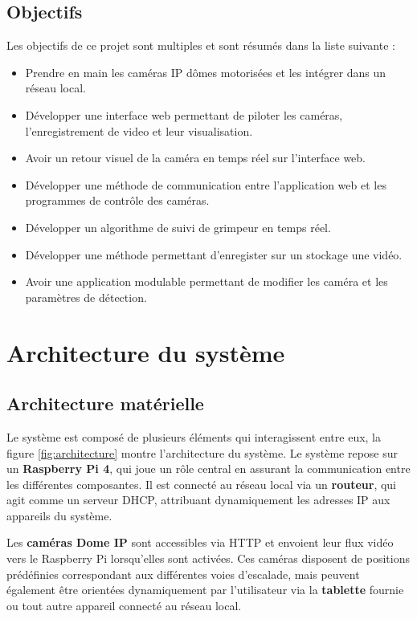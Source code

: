 \documentclass[a4paper, 11pt, french]{article}
\newcounter{obj}
\begin{document}
\subsection{Objectifs}
Les objectifs de ce projet sont multiples et sont résumés dans la liste suivante :
\begin{itemize}
  \item Prendre en main les caméras IP dômes motorisées et les intégrer dans un réseau local.
  \item Développer une interface web permettant de piloter les caméras, l'enregistrement de video et leur visualisation.
  \item Avoir un retour visuel de la caméra en temps réel sur l'interface web.
  \item Développer une méthode de communication entre l'application web et les programmes de contrôle des caméras.
  \item Développer un algorithme de suivi de grimpeur en temps réel.
  \item Développer une méthode permettant d'enregister sur un stockage une vidéo.
  \item Avoir une application modulable permettant de modifier les caméra et les paramètres de détection.
\end{itemize}

\section{Architecture du système}
\subsection{Architecture matérielle}
Le système est composé de plusieurs éléments qui interagissent entre eux, la figure \ref{fig:architecture} montre l'architecture du système. Le système repose sur un \textbf{Raspberry Pi 4}, qui joue un rôle central en assurant la communication entre les différentes composantes. Il est connecté au réseau local via un \textbf{routeur}, qui agit comme un serveur DHCP, attribuant dynamiquement les adresses IP aux appareils du système.

Les \textbf{caméras Dome IP} sont accessibles via HTTP et envoient leur flux vidéo vers le Raspberry Pi lorsqu’elles sont activées. Ces caméras disposent de positions prédéfinies correspondant aux différentes voies d’escalade, mais peuvent également être orientées dynamiquement par l’utilisateur via la \textbf{tablette} fournie ou tout autre appareil connecté au réseau local.
\end{document}
